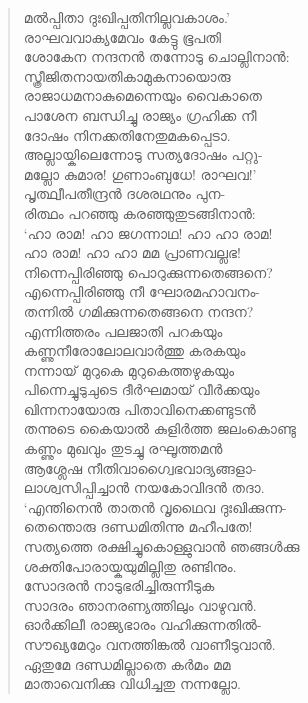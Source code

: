 \begin{verse}
മല്‍പ്പിതാ ദുഃഖിപ്പതിനില്ലവകാശം.’\\
രാഘവവാക്യമേവം കേട്ടു ഭൂപതി\\
ശോകേന നന്ദനന്‍ തന്നോടു ചൊല്ലിനാന്‍:\\
സ്ത്രീജിതനായതികാമുകനായൊരു\\
രാജാധമനാകുമെന്നെയും വൈകാതെ\\
പാശേന ബന്ധിച്ചു രാജ്യം ഗ്രഹിക്ക നീ\\
ദോഷം നിനക്കതിനേതുമകപ്പെടാ.\\
അല്ലായ്കിലെന്നോടു സത്യദോഷം പറ്റു-\\
മല്ലോ കുമാര! ഗുണാംബുധേ! രാഘവ!’\\
പൃത്ഥ്വീപതീന്ദ്രന്‍ ദശരഥനും പുന-\\
രിത്ഥം പറഞ്ഞു കരഞ്ഞുതുടങ്ങിനാന്‍:\\
‘ഹാ രാമ! ഹാ ജഗന്നാഥ! ഹാ ഹാ രാമ!\\
ഹാ രാമ! ഹാ ഹാ മമ പ്രാണവല്ലഭ!\\
നിന്നെപ്പിരിഞ്ഞു പൊറുക്കുന്നതെങ്ങനെ?\\
എന്നെപ്പിരിഞ്ഞു നീ ഘോരമഹാവനം-\\
തന്നില്‍ ഗമിക്കുന്നതെങ്ങനെ നന്ദന?\\
എന്നിത്തരം പലജാതി പറകയും\\
കണ്ണുനീരോലോലവാര്‍ത്തു കരകയും\\
നന്നായ് മുറുകെ മുറുകെത്തഴുകയും\\
പിന്നെച്ചുടുചുടെ ദീര്‍ഘമായ് വീര്‍ക്കയും\\
ഖിന്നനായോരു പിതാവിനെക്കണ്ടുടന്‍\\
തന്നുടെ കൈയാല്‍ കുളിര്‍ത്ത ജലംകൊണ്ടു\\
കണ്ണും മുഖവും തുടച്ചു രഘൂത്തമന്‍\\
ആശ്ലേഷ നീതിവാഗ്വൈഭവാദ്യങ്ങളാ-\\
ലാശ്വസിപ്പിച്ചാന്‍ നയകോവിദന്‍ തദാ.\\
‘എന്തിനെന്‍ താതന്‍ വൃഥൈവ ദുഃഖിക്കുന്ന-\\
തെന്തൊരു ദണ്ഡമിതിന്നു മഹീപതേ!\\
സത്യത്തെ രക്ഷിച്ചുകൊള്ളുവാന്‍ ഞങ്ങള്‍ക്കു\\
ശക്തിപോരായ്കയുമില്ലിതു രണ്ടിനും.\\
സോദരന്‍ നാടുഭരിച്ചിരുന്നീടുക\\
സാദരം ഞാനരണ്യത്തിലും വാഴുവന്‍.\\
ഓര്‍ക്കിലീ രാജ്യഭാരം വഹിക്കുന്നതില്‍-\\
സൗഖ്യമേറും വനത്തിങ്കല്‍ വാണീടുവാന്‍.\\
ഏതുമേ ദണ്ഡമില്ലാതെ കര്‍മം മമ\\
മാതാവെനിക്കു വിധിച്ചതു നന്നല്ലോ.\\

\end{verse}
